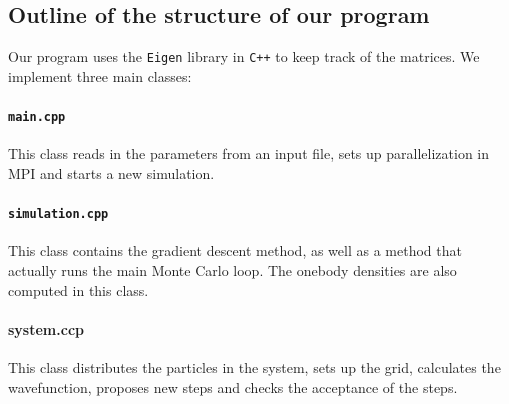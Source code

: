 \documentclass[a4paper, 10pt]{article}
\begin{document}
	\subsection{Outline of the structure of our program}
	Our program uses the \texttt{Eigen} library in \texttt{C++} to keep track of the matrices. We implement three main classes:\\
	\paragraph{\texttt{main.cpp}}
	This class reads in the parameters from an input file, sets up parallelization in MPI and starts a new simulation.\\
	\linebreak
	\paragraph{\texttt{simulation.cpp}}
	This class contains the gradient descent method, as well as a method that actually runs the main Monte Carlo loop. The onebody densities are also computed in this class.\\
	\linebreak
	\paragraph{system.ccp}
	This class distributes the particles in the system, sets up the grid, calculates the wavefunction, proposes new steps and checks the acceptance of the steps. 
\end{document}
